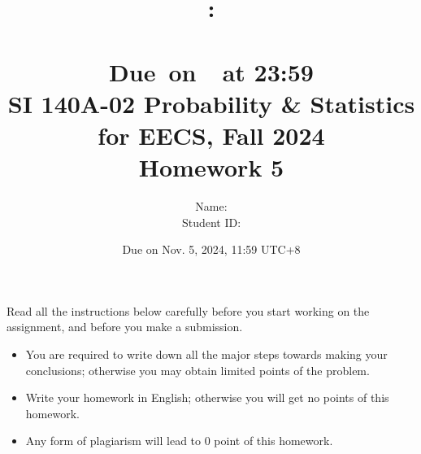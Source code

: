 \documentclass[a4paper]{article}
\title{
    \vspace{2in}
    \textmd{\textbf{\hmwkClass:\\  \hmwkTitle}}\\
    \normalsize\vspace{0.1in}\small{Due\ on\ \hmwkDueDate\ at 23:59}\\
	\vspace{4in}
}
\author{
	Name: \textbf{\hmwkAuthorName} \\
	Student ID: \hmwkAuthorID}
\date{}
\begin{document}

\date{
Due on Nov. 5, 2024, 11:59 UTC+8}
\title{SI 140A-02  Probability \& Statistics for EECS, Fall 2024 \\
Homework 5}
\maketitle
Read all the instructions below carefully before you start working on the assignment, and before you make a submission.
\begin{itemize}
    \item You are required to write down all the major steps towards making your conclusions; otherwise you may obtain limited points of the problem.
    \item Write your homework in English; otherwise you will get no points of this homework.
    \item Any form of plagiarism will lead to $0$ point of this homework. 
\end{itemize}
\newpage
\end{document}
